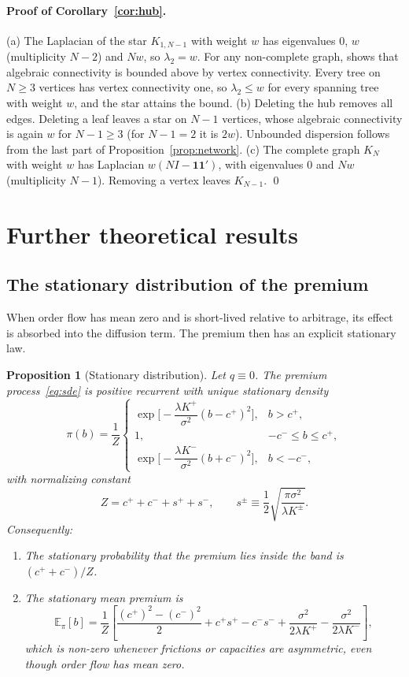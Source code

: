 \documentclass[12pt]{article}
\newtheorem{proposition}{Proposition}
\theoremstyle{definition}
\theoremstyle{remark}
\newcommand{\E}{\mathbb{E}}
\begin{document}
\paragraph{Proof of Corollary~\ref{cor:hub}.}
(a) The Laplacian of the star $K_{1,N-1}$ with weight $w$ has eigenvalues $0$, $w$ (multiplicity $N-2$) and $Nw$, so $\lambda_2=w$. For any non-complete graph, \citet{fiedler1973algebraic} shows that algebraic connectivity is bounded above by vertex connectivity. Every tree on $N\ge3$ vertices has vertex connectivity one, so $\lambda_2\le w$ for every spanning tree with weight $w$, and the star attains the bound.
(b) Deleting the hub removes all edges. Deleting a leaf leaves a star on $N-1$ vertices, whose algebraic connectivity is again $w$ for $N-1\ge3$ (for $N-1=2$ it is $2w$). Unbounded dispersion follows from the last part of Proposition~\ref{prop:network}.
(c) The complete graph $K_N$ with weight $w$ has Laplacian $w(NI-\mathbf 1\mathbf 1')$, with eigenvalues $0$ and $Nw$ (multiplicity $N-1$). Removing a vertex leaves $K_{N-1}$. \qed


\section{Further theoretical results}\label{app:theory}

\subsection{The stationary distribution of the premium}

When order flow has mean zero and is short-lived relative to arbitrage, its effect is absorbed into the diffusion term. The premium then has an explicit stationary law.

\begin{proposition}[Stationary distribution]\label{prop:stationary}
Let $q\equiv0$. The premium process~\eqref{eq:sde} is positive recurrent with unique stationary density
\begin{equation}\label{eq:density}
\pi(b) = \frac{1}{Z}
\begin{cases}
\exp\!\Big[-\dfrac{\lambda K^+}{\sigma^2}(b-c^+)^2\Big], & b>c^+,\\[8pt]
1, & -c^-\le b\le c^+,\\[4pt]
\exp\!\Big[-\dfrac{\lambda K^-}{\sigma^2}(b+c^-)^2\Big], & b<-c^-,
\end{cases}
\end{equation}
with normalizing constant
\[
Z = c^++c^- + s^+ + s^-,\qquad s^\pm \equiv \frac12\sqrt{\frac{\pi\sigma^2}{\lambda K^\pm}} .
\]
Consequently:
\begin{enumerate}[label=(\alph*)]
\item The stationary probability that the premium lies inside the band is $(c^++c^-)/Z$.
\item The stationary mean premium is
\[
\E_\pi[b] = \frac{1}{Z}\left[\frac{(c^+)^2-(c^-)^2}{2} + c^+s^+ - c^-s^- + \frac{\sigma^2}{2\lambda K^+} - \frac{\sigma^2}{2\lambda K^-}\right],
\]
which is non-zero whenever frictions or capacities are asymmetric, even though order flow has mean zero.
\end{enumerate}
\end{proposition}
\end{document}
